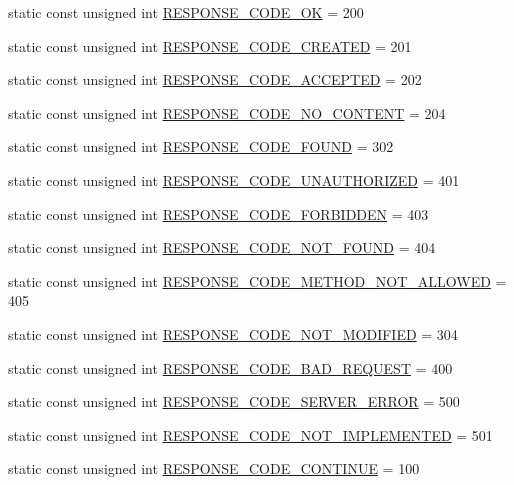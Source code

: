 \begin{DoxyCompactItemize}
static const unsigned int \hyperlink{structpion_1_1http_1_1types_a5f5e6e1a214b3b91313843fa8f36cc4c}{R\-E\-S\-P\-O\-N\-S\-E\-\_\-\-C\-O\-D\-E\-\_\-\-O\-K} = 200
\item 
static const unsigned int \hyperlink{structpion_1_1http_1_1types_a72a0af74251c62d7271f70369c0b7c55}{R\-E\-S\-P\-O\-N\-S\-E\-\_\-\-C\-O\-D\-E\-\_\-\-C\-R\-E\-A\-T\-E\-D} = 201
\item 
static const unsigned int \hyperlink{structpion_1_1http_1_1types_ad6627bcaec2488da093e8ad6ebd8bc22}{R\-E\-S\-P\-O\-N\-S\-E\-\_\-\-C\-O\-D\-E\-\_\-\-A\-C\-C\-E\-P\-T\-E\-D} = 202
\item 
static const unsigned int \hyperlink{structpion_1_1http_1_1types_ab31ecbc138d67e5e098e16bc21c55bd4}{R\-E\-S\-P\-O\-N\-S\-E\-\_\-\-C\-O\-D\-E\-\_\-\-N\-O\-\_\-\-C\-O\-N\-T\-E\-N\-T} = 204
\item 
static const unsigned int \hyperlink{structpion_1_1http_1_1types_ab24b9a4098bce2885dfd3e2eb846a901}{R\-E\-S\-P\-O\-N\-S\-E\-\_\-\-C\-O\-D\-E\-\_\-\-F\-O\-U\-N\-D} = 302
\item 
static const unsigned int \hyperlink{structpion_1_1http_1_1types_a04e9680b7d896983fefe6d256d54094d}{R\-E\-S\-P\-O\-N\-S\-E\-\_\-\-C\-O\-D\-E\-\_\-\-U\-N\-A\-U\-T\-H\-O\-R\-I\-Z\-E\-D} = 401
\item 
static const unsigned int \hyperlink{structpion_1_1http_1_1types_a5d02faf5aa46957db9b4d01f6134c7c9}{R\-E\-S\-P\-O\-N\-S\-E\-\_\-\-C\-O\-D\-E\-\_\-\-F\-O\-R\-B\-I\-D\-D\-E\-N} = 403
\item 
static const unsigned int \hyperlink{structpion_1_1http_1_1types_af6392ad941d01c446d95999252888f45}{R\-E\-S\-P\-O\-N\-S\-E\-\_\-\-C\-O\-D\-E\-\_\-\-N\-O\-T\-\_\-\-F\-O\-U\-N\-D} = 404
\item 
static const unsigned int \hyperlink{structpion_1_1http_1_1types_afdaf4bd3e562cc81ac01e4261d190b60}{R\-E\-S\-P\-O\-N\-S\-E\-\_\-\-C\-O\-D\-E\-\_\-\-M\-E\-T\-H\-O\-D\-\_\-\-N\-O\-T\-\_\-\-A\-L\-L\-O\-W\-E\-D} = 405
\item 
static const unsigned int \hyperlink{structpion_1_1http_1_1types_a6479482d3538737851c92b5dca0ee2b4}{R\-E\-S\-P\-O\-N\-S\-E\-\_\-\-C\-O\-D\-E\-\_\-\-N\-O\-T\-\_\-\-M\-O\-D\-I\-F\-I\-E\-D} = 304
\item 
static const unsigned int \hyperlink{structpion_1_1http_1_1types_a45e55c48104a6511f28467d8f44bb48c}{R\-E\-S\-P\-O\-N\-S\-E\-\_\-\-C\-O\-D\-E\-\_\-\-B\-A\-D\-\_\-\-R\-E\-Q\-U\-E\-S\-T} = 400
\item 
static const unsigned int \hyperlink{structpion_1_1http_1_1types_a685d49b20c27b0d2b9365edd374416b9}{R\-E\-S\-P\-O\-N\-S\-E\-\_\-\-C\-O\-D\-E\-\_\-\-S\-E\-R\-V\-E\-R\-\_\-\-E\-R\-R\-O\-R} = 500
\item 
static const unsigned int \hyperlink{structpion_1_1http_1_1types_a633343f33f232ed411511ec18f112d7c}{R\-E\-S\-P\-O\-N\-S\-E\-\_\-\-C\-O\-D\-E\-\_\-\-N\-O\-T\-\_\-\-I\-M\-P\-L\-E\-M\-E\-N\-T\-E\-D} = 501
\item 
static const unsigned int \hyperlink{structpion_1_1http_1_1types_a65920fc72bb4d4d9b7c44b3f7fa8f539}{R\-E\-S\-P\-O\-N\-S\-E\-\_\-\-C\-O\-D\-E\-\_\-\-C\-O\-N\-T\-I\-N\-U\-E} = 100
\end{DoxyCompactItemize}


